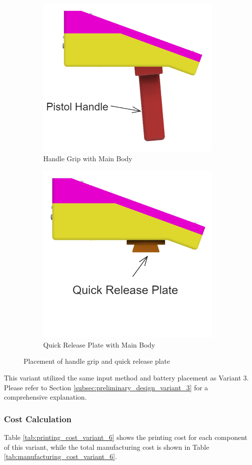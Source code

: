 \begin{figure}[!ht]
    \centering
    \begin{subfigure}[c]{0.47\textwidth}
        \begin{minipage}{\textwidth}
            \centering
            \includegraphics[height=4 cm]{texs/Part1/chapter4/image/v63.png}
        \end{minipage}
        \caption{Handle Grip with Main Body}
        \label{fig:variant6_handle_grip_main_body}
    \end{subfigure}
    \begin{subfigure}[c]{0.5\textwidth}
        \begin{minipage}{\textwidth}
            \centering
            \includegraphics[height=4 cm]{texs/Part1/chapter4/image/v64.png}
        \end{minipage}
        \caption{Quick Release Plate with Main Body}
        \label{fig:variant6_quick_release_plate_main_body}
    \end{subfigure}
    \caption{Placement of handle grip and quick release plate}
    \label{fig:variant6_handle_grip_quick_release_plate}
\end{figure}

This variant utilized the same input method and battery placement as Variant 3. Please refer to Section \ref{subsec:preliminary_design_variant_3} for a comprehensive explanation.

\subsubsection{Cost Calculation}
Table \ref{tab:printing_cost_variant_6} shows the printing cost for each component of this variant, while the total manufacturing cost is shown in Table \ref{tab:manufacturing_cost_variant_6}.

